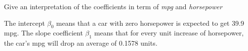 Give an interpretation of the coefficients in term of \textit{mpg} and \textit{horsepower}

\soln* The intercept $\beta_0$ means that a car with zero horsepower is expected to get 39.9 mpg. The slope coefficient $\beta_1$ means that for every unit increase of horsepower, the car's mpg will drop an average of 0.1578 units.